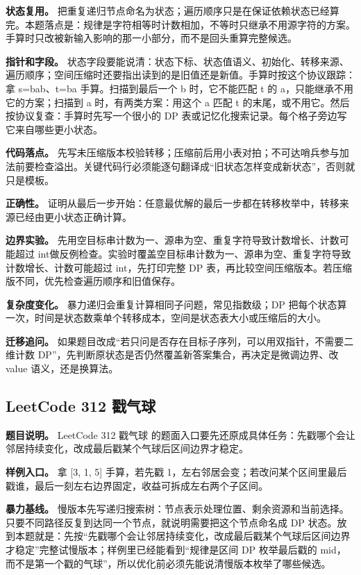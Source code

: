 \textbf{状态复用。} 把重复递归节点命名为状态；遍历顺序只是在保证依赖状态已经算完。本题落点是：规律是字符相等时计数相加，不等时只继承不用源字符的方案。手算时只改被新输入影响的那一小部分，而不是回头重算完整候选。

\textbf{指针和字段。} 状态字段要能说清：状态下标、状态值语义、初始化、转移来源、遍历顺序；空间压缩时还要指出读到的是旧值还是新值。手算时按这个协议跟踪：拿 s=bab、t=ba 手算。扫描到最后一个 b 时，它不能匹配 t 的 a，只能继承不用它的方案；扫描到 a 时，有两类方案：用这个 a 匹配 t 的末尾，或不用它。然后按协议复查：手算时先写一个很小的 DP 表或记忆化搜索记录。每个格子旁边写它来自哪些更小状态。

\textbf{代码落点。} 先写未压缩版本校验转移；压缩前后用小表对拍；不可达哨兵参与加法前要检查溢出。关键代码行必须能逐句翻译成“旧状态怎样变成新状态”，否则就只是模板。

\textbf{正确性。} 证明从最后一步开始：任意最优解的最后一步都在转移枚举中，转移来源已经由更小状态正确计算。

\textbf{边界实验。} 先用空目标串计数为一、源串为空、重复字符导致计数增长、计数可能超过 int做反例检查。实验时覆盖空目标串计数为一、源串为空、重复字符导致计数增长、计数可能超过 int，先打印完整 DP 表，再比较空间压缩版本。若压缩版不同，优先检查遍历顺序和旧值保存。

\textbf{复杂度变化。} 暴力递归会重复计算相同子问题，常见指数级；DP 把每个状态算一次，时间是状态数乘单个转移成本，空间是状态表大小或压缩后的大小。

\textbf{迁移追问。} 如果题目改成“若只问是否存在目标子序列，可以用双指针，不需要二维计数 DP”，先判断原状态是否仍然覆盖新答案集合，再决定是微调边界、改 value 语义，还是换算法。

\subsection{LeetCode 312 戳气球}

\textbf{题目说明。} LeetCode 312 戳气球 的题面入口要先还原成具体任务：先戳哪个会让邻居持续变化，改成最后戳某个气球后区间边界才稳定。

\textbf{样例入口。} 拿 [3, 1, 5] 手算，若先戳 1，左右邻居会变；若改问某个区间里最后戳谁，最后一刻左右边界固定，收益可拆成左右两个子区间。

\textbf{暴力基线。} 慢版本先写递归搜索树：节点表示处理位置、剩余资源和当前选择。只要不同路径反复到达同一个节点，就说明需要把这个节点命名成 DP 状态。放到本题就是：先按“先戳哪个会让邻居持续变化，改成最后戳某个气球后区间边界才稳定”完整试慢版本；样例里已经能看到“规律是区间 DP 枚举最后戳的 mid，而不是第一个戳的气球”，所以优化前必须先能说清慢版本枚举了哪些候选。

